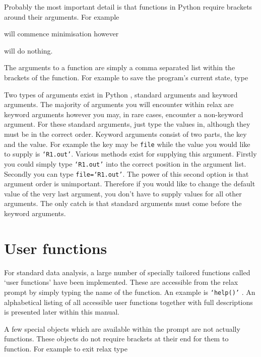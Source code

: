 Probably the most important detail is that functions in Python require brackets around their arguments.  For example


will commence minimisation  however


will do nothing.

The arguments to a function are simply a comma separated list within the brackets of the function.  For example to save the program's current state, type


Two types of arguments exist in Python , standard arguments and keyword arguments.  The majority of arguments you will encounter within relax are keyword arguments however you may, in rare cases, encounter a non-keyword argument.  For these standard arguments, just type the values in, although they must be in the correct order.  Keyword arguments consist of two parts, the key and the value.  For example the key may be \texttt{file} while the value you would like to supply is \texttt{`R1.out'}.  Various methods exist for supplying this argument.  Firstly you could simply type \texttt{`R1.out'} into the correct position in the argument list.  Secondly you can type \texttt{file=`R1.out'}.  The power of this second option is that argument order is unimportant.  Therefore if you would like to change the default value of the very last argument, you don't have to supply values for all other arguments.  The only catch is that standard arguments must come before the keyword arguments.




\section{User functions}

For standard data analysis, a large number of specially tailored functions called `user functions' have been implemented.  These are accessible from the relax prompt by simply typing the name of the function.  An example is \texttt{`help()'} .  An alphabetical listing of all accessible user functions together with full descriptions is presented later within this manual.

A few special objects which are available within the prompt are not actually functions.  These objects do not require brackets at their end for them to function.  For example to exit relax type

